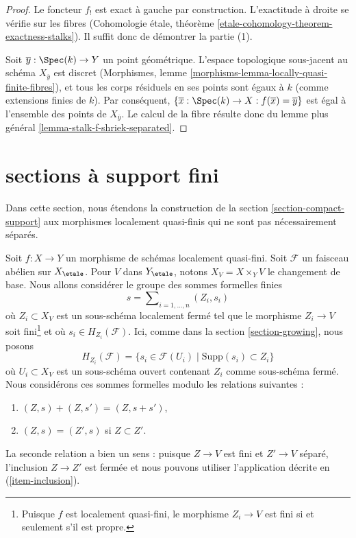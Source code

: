 \begin{proof}
Le foncteur $f_!$ est exact à gauche par construction. L'exactitude à droite
se vérifie sur les fibres
(Cohomologie étale, théorème \ref{etale-cohomology-theorem-exactness-stalks}).
Il suffit donc de démontrer la partie (1).

\medskip\noindent
Soit $\overline{y} : \Spec(k) \to Y$ un point géométrique.
L'espace topologique sous-jacent au schéma $X_{\overline{y}}$
est discret
(Morphismes, lemme \ref{morphisms-lemma-locally-quasi-finite-fibres}),
et tous les corps résiduels en ses points sont égaux à $k$
(comme extensions finies de $k$). Par conséquent,
$\{\overline{x} : \Spec(k) \to X : f(\overline{x}) = \overline{y}\}$
est égal à l'ensemble des points de $X_{\overline{y}}$.
Le calcul de la fibre résulte donc du
lemme plus général \ref{lemma-stalk-f-shriek-separated}.
\end{proof}









\section{sections à support fini}
\label{section-finite-support}

\noindent
Dans cette section, nous étendons la construction de la
section \ref{section-compact-support} aux morphismes localement
quasi-finis qui ne sont pas nécessairement séparés.

\medskip\noindent
Soit $f : X \to Y$ un morphisme de schémas localement quasi-fini.
Soit $\mathcal{F}$ un faisceau abélien sur $X_\etale$. Pour $V$ dans
$Y_\etale$, notons $X_V = X \times_Y V$ le changement de base. Nous allons
considérer le groupe des sommes formelles finies
\begin{equation}
\label{equation-formal-sum}
s = \sum\nolimits_{i = 1, \ldots, n} (Z_i, s_i)
\end{equation}
où $Z_i \subset X_V$ est un sous-schéma localement fermé tel que le
morphisme $Z_i \to V$ soit fini\footnote{Puisque $f$ est localement quasi-fini,
le morphisme $Z_i \to V$ est fini si et seulement s'il est propre.}
et où $s_i \in H_{Z_i}(\mathcal{F})$. Ici, comme dans la
section \ref{section-growing}, nous posons
$$
H_{Z_i}(\mathcal{F}) =
\{s_i \in \mathcal{F}(U_i) \mid \text{Supp}(s_i) \subset Z_i\}
$$
où $U_i \subset X_V$ est un sous-schéma ouvert contenant $Z_i$ comme
sous-schéma fermé. Nous considérons ces sommes formelles modulo les
relations suivantes :
\begin{enumerate}
\item
\label{item-sum}
$(Z, s) + (Z, s') = (Z, s + s')$,
\item
\label{item-sub}
$(Z, s) = (Z', s)$ si $Z \subset Z'$.
\end{enumerate}
La seconde relation a bien un sens : puisque $Z \to V$ est fini
et $Z' \to V$ séparé, l'inclusion $Z \to Z'$ est fermée et nous
pouvons utiliser l'application décrite en (\ref{item-inclusion}).

